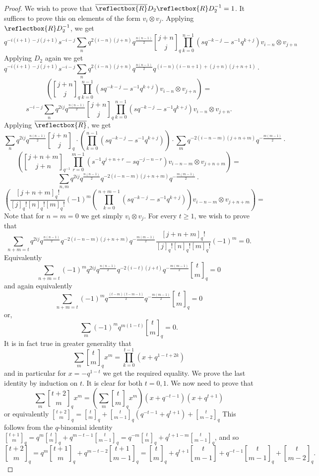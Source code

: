 \documentclass[letterpaper]{amsart}
\begin{document}
\begin{proof}
    We wish to prove that $\overline{\reflectbox{R}}D_2 \reflectbox{R}D_2^{-1} = 1$. It suffices to prove this on elements of the form $v_i \otimes v_j$. Applying $\reflectbox{R}D_2^{-1}$, we get
    $$q^{- i(i+1) - j(j+1)} s^{-i-j}\sum_n q^{2(i-n)(j+n)} q^{\frac{n(n-1)}{2}}{ j + n \brack j}_q \prod_{k=0}^{n-1} (sq^{-k-j} - s^{-1}q^{k+j})  v_{i-n} \otimes v_{j+n}$$
    Applying $D_2$ again we get
    $$q^{- i(i+1) - j(j+1)} s^{-i-j}\sum_n q^{2(i-n)(j+n)} q^{\frac{n(n-1)}{2}} q^{(i-n)(i-n+1) + (j+n)(j+n+1)} \cdot $$
    $$\left({ j + n \brack j}_q \prod_{k=0}^{n-1} (sq^{-k-j} - s^{-1}q^{k+j})  v_{i-n} \otimes v_{j+n}\right) = $$
    $$s^{-i-j} \sum_n q^{2ij}q^{\frac{n(n-1)}{2}} {j + n \brack j}_q \prod_{k=0}^{n-1} (sq^{-k-j} - s^{-1}q^{k+j}) v_{i-n} \otimes v_{j + n}.$$
    Applying $\overline{\reflectbox{R}}$, we get
    $$\sum_n q^{2ij} q^{\frac{n(n-1)}{2}} {j + n \brack j}_q \cdot\left(\prod_{k=0}^{n-1} (sq^{-k-j} - s^{-1}q^{k+j})\right)\cdot \sum_m q^{-2(i-n-m)(j+n+m)} q^{-\frac{m(m-1)}{2}} \cdot$$
    $$\left({j + n + m \brack j + n}_{q^{-1}} \prod_{r=0}^{m - 1} (s^{-1}q^{j + n + r} - sq^{-j -n -r}) v_{i-n-m} \otimes v_{j+n+m}\right) = $$
    $$\sum_{n,m} q^{2ij} q^{\frac{n(n-1)}{2}}  q^{-2(i-n-m)(j+n+m)} q^{-\frac{m(m-1)}{2}} \cdot $$
    $$\left(\frac{[j + n + m]_q!}{[j]_q![n]_q![m]_q!} (-1)^m \left(\prod_{k=0}^{n + m -1} (sq^{-k-j} - s^{-1}q^{k+j})\right) v_{i-n-m} \otimes v_{j+n+m}\right) = $$
    Note that for $n=m=0$ we get simply $v_i \otimes v_j$.
    For every $t \geq 1$, we wish to prove that
    $$\sum_{n + m = t} q^{2ij} q^{\frac{n(n-1)}{2}} q^{-2(i-n-m)(j+n+m)} q^{-\frac{m(m-1)}{2}} \frac{[j+n+m]_q!}{[j]_q![n]_q![m]_q!} (-1)^m = 0.$$
    Equivalently
    $$\sum_{n + m = t} (-1)^m q^{2ij} q^{\frac{n(n-1)}{2}} q^{-2(i-t)(j+t)} q^{-\frac{m(m-1)}{2}} {t \brack m}_q = 0$$
    and again equivalently
    $$\sum_{n + m = t} (-1)^m q^{\frac{(t- m)(t - m - 1)}{2}} q^{-\frac{m(m -1)}{2}} {t \brack m}_q = 0$$
    or,
    $$\sum_{m} (-1)^m q^{m(1-t)} {t \brack m}_q = 0.$$
    It is in fact true in greater generality that
    $$\sum_m {t \brack m}_q x^m = \prod_{k=0}^{t-1} (x + q^{1 - t + 2k})$$
    and in particular for $x = -q^{1 - t}$ we get the required equality.
    We prove the last identity by induction on $t$. It is clear for both $t = 0, 1$. We now need to prove that
    $$\sum_m {t + 2 \brack m}_q x^m = (\sum_m {t \brack m}_q x^m)(x + q^{-t - 1})(x + q^{t + 1})$$
or equivalently ${t + 2 \brack m}_q = {t \brack m}_q + {t \brack m - 1}_q(q^{-t-1} + q^{t + 1}) + {t \brack m - 2}_q$
This follows from the $q$-binomial identity
${t + 1 \brack m}_q = q^m {t \brack m}_q + q^{m - t - 1}{t \brack m - 1}_q = q^{-m}{t \brack m}_q + q^{t + 1 - m}{t \brack m - 1}_q$, and so
$${t + 2 \brack m}_q = q^m{t + 1 \brack m}_q + q^{m - t - 2}{t + 1 \brack m - 1}_q = {t \brack m}_q + q^{t + 1}{t \brack m - 1} + q^{-t - 1}{t \brack m - 1}_q + {t \brack m - 2}_q.$$
\end{proof}
\end{document}
